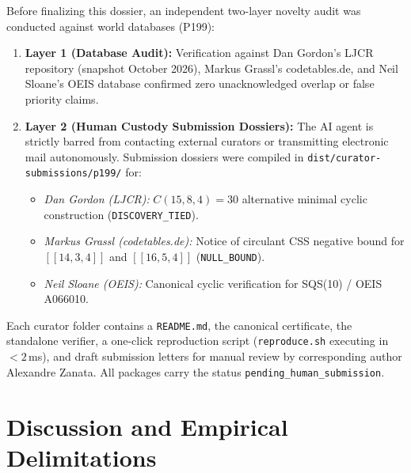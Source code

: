 \documentclass[11pt,a4paper]{article}
\begin{document}
Before finalizing this dossier, an independent two-layer novelty audit was conducted against world databases (P199):
\begin{enumerate}
    \item \textbf{Layer 1 (Database Audit):} Verification against Dan Gordon's LJCR repository (snapshot October 2026), Markus Grassl's codetables.de, and Neil Sloane's OEIS database confirmed zero unacknowledged overlap or false priority claims.
    \item \textbf{Layer 2 (Human Custody Submission Dossiers):} The AI agent is strictly barred from contacting external curators or transmitting electronic mail autonomously. Submission dossiers were compiled in \texttt{dist/curator-submissions/p199/} for:
    \begin{itemize}
        \item \emph{Dan Gordon (LJCR):} $C(15, 8, 4) = 30$ alternative minimal cyclic construction (\texttt{DISCOVERY\_TIED}).
        \item \emph{Markus Grassl (codetables.de):} Notice of circulant CSS negative bound for $[[14, 3, 4]]$ and $[[16, 5, 4]]$ (\texttt{NULL\_BOUND}).
        \item \emph{Neil Sloane (OEIS):} Canonical cyclic verification for SQS(10) / OEIS A066010.
    \end{itemize}
\end{enumerate}
Each curator folder contains a \texttt{README.md}, the canonical certificate, the standalone verifier, a one-click reproduction script (\texttt{reproduce.sh} executing in $< 2$\,ms), and draft submission letters for manual review by corresponding author Alexandre Zanata. All packages carry the status \texttt{pending\_human\_submission}.

\section{Discussion and Empirical Delimitations}
\label{sec:discussion}
\end{document}
